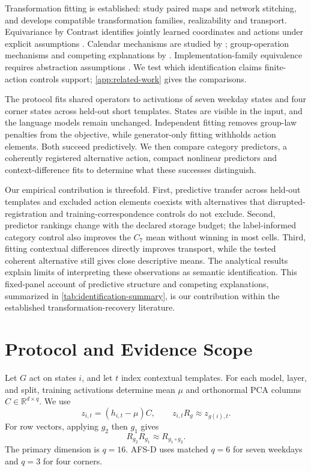 \documentclass{article}
\newcommand{\R}{\mathbb{R}}
\begin{document}
Transformation fitting is established: \citet{lenc2015understanding} study paired maps and network stitching, and \citet{sun2026transformationlaws} develops compatible transformation families, realizability and transport. Equivariance by Contrast identifies jointly learned coordinates and actions under explicit assumptions \citep{schmidt2025equivariance}. Calendar mechanisms are studied by \citet{engels2025notall}; group-operation mechanisms and competing explanations by \citet{nanda2023progress,chughtai2023toy,wu2025unified}. Implementation-family equivalence requires abstraction assumptions \citep{sun2026tracking}. We test which identification claims finite-action controls support; \cref{app:related-work} gives the comparisons.

The protocol fits shared operators to activations of seven weekday states and four corner states across held-out short templates. States are visible in the input, and the language models remain unchanged. Independent fitting removes group-law penalties from the objective, while generator-only fitting withholds action elements. Both succeed predictively. We then compare category predictors, a coherently registered alternative action, compact nonlinear predictors and context-difference fits to determine what these successes distinguish.

Our empirical contribution is threefold. First, predictive transfer across held-out templates and excluded action elements coexists with alternatives that disrupted-registration and training-correspondence controls do not exclude. Second, predictor rankings change with the declared storage budget; the label-informed category control also improves the $C_7$ mean without winning in most cells. Third, fitting contextual differences directly improves transport, while the tested coherent alternative still gives close descriptive means. The analytical results explain limits of interpreting these observations as semantic identification. This fixed-panel account of predictive structure and competing explanations, summarized in \cref{tab:identification-summary}, is our contribution within the established transformation-recovery literature.



\section{Protocol and Evidence Scope}
\label{sec:setup}
Let $G$ act on states $i$, and let $t$ index contextual templates. For each model, layer, and split, training activations determine mean $\mu$ and orthonormal PCA columns $C\in\R^{d\times q}$. We use
\begin{equation}
 z_{i,t}=(h_{i,t}-\mu)C,\qquad z_{i,t}R_g\approx z_{g(i),t}.
\end{equation}
For row vectors, applying $g_2$ then $g_1$ gives
\begin{equation}
 R_{g_2}R_{g_1}\approx R_{g_1\circ g_2}.
 \label{eq:convention}
\end{equation}
The primary dimension is $q=16$. AFS-D uses matched $q=6$ for seven weekdays and $q=3$ for four corners.
\end{document}
